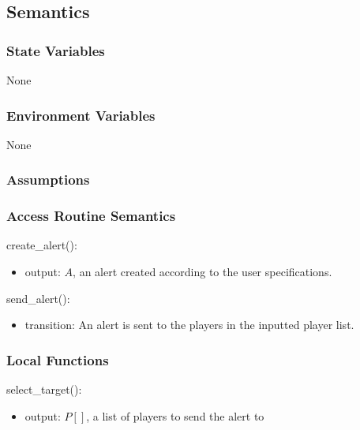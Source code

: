 \documentclass[12pt, titlepage]{article}
\begin{document}
\subsection{Semantics}

\subsubsection{State Variables}

None

\subsubsection{Environment Variables}

None

\subsubsection{Assumptions}


\subsubsection{Access Routine Semantics}

\noindent create\_alert():
\begin{itemize}
\item output: $A$, an alert created according to the user specifications.
\end{itemize}

\noindent send\_alert():
\begin{itemize}
\item transition: An alert is sent to the players in the inputted player list.
\end{itemize}

\subsubsection{Local Functions}

\noindent select\_target():
\begin{itemize}
\item output: $P[]$, a list of players to send the alert to
\end{itemize}

\newpage
\end{document}
